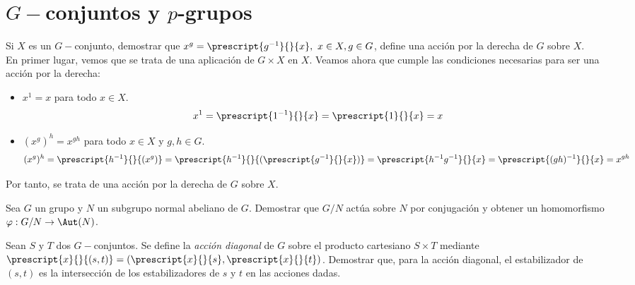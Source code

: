 \section{$G-$conjuntos y $p$-grupos}

\begin{ejercicio}\label{ej:6.1}
    Si $X$ es un $G-$conjunto, demostrar que $x^g = \prescript{g^{-1}}{}{x},~ x \in X, g \in G$, define una acción por la derecha de $G$ sobre $X$.\\

    En primer lugar, vemos que se trata de una aplicación de $G \times X$ en $X$. Veamos ahora que cumple las condiciones necesarias para ser una acción por la derecha:
    \begin{itemize}
        \item $x^1 = x$ para todo $x \in X$.
        \begin{equation*}
            x^1 = \prescript{1^{-1}}{}{x} = \prescript{1}{}{x} = x
        \end{equation*}

        \item $(x^g)^h = x^{gh}$ para todo $x \in X$ y $g, h \in G$.
        \begin{equation*}
            (x^g)^h = \prescript{h^{-1}}{}{(x^g)} = \prescript{h^{-1}}{}{(\prescript{g^{-1}}{}{x})} = \prescript{h^{-1}g^{-1}}{}{x} =  \prescript{(gh)^{-1}}{}{x} = x^{gh}
        \end{equation*}
    \end{itemize}

    Por tanto, se trata de una acción por la derecha de $G$ sobre $X$.
\end{ejercicio}

\begin{ejercicio}\label{ej:6.2}
    Sea $G$ un grupo y $N$ un subgrupo normal abeliano de $G$. Demostrar que $G/N$ actúa sobre $N$ por conjugación y obtener un homomorfismo $\varphi: G/N \to \Aut(N)$.
\end{ejercicio}

\begin{ejercicio}\label{ej:6.3}
    Sean $S$ y $T$ dos $G-$conjuntos. Se define la \emph{acción diagonal} de $G$ sobre el producto cartesiano $S \times T$ mediante $\prescript{x}{}{(s,t)} = (\prescript{x}{}{s},\prescript{x}{}{t})$. Demostrar que, para la acción diagonal, el estabilizador de $(s, t)$ es la intersección de los estabilizadores de $s$ y $t$ en las acciones dadas.
\end{ejercicio}

